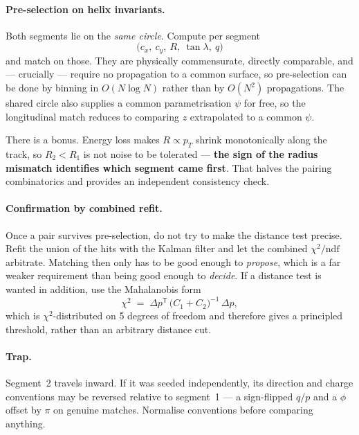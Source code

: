 \documentclass[11pt,a4paper]{article}
\begin{document}
\paragraph{Pre-selection on helix invariants.} Both segments lie on the
\emph{same circle}. Compute per segment
\begin{equation}
  \bigl(c_x,\ c_y,\ R,\ \tan\lambda,\ q\bigr)
\end{equation}
and match on those. They are physically commensurate, directly comparable, and
--- crucially --- require no propagation to a common surface, so pre-selection
can be done by binning in $O(N \log N)$ rather than by $O(N^2)$ propagations.
The shared circle also supplies a common parametrisation $\psi$ for free, so the
longitudinal match reduces to comparing $z$ extrapolated to a common $\psi$.

There is a bonus. Energy loss makes $R \propto p_T$ shrink monotonically along
the track, so $R_2 < R_1$ is not noise to be tolerated --- \textbf{the sign of
the radius mismatch identifies which segment came first}. That halves the
pairing combinatorics and provides an independent consistency check.

\paragraph{Confirmation by combined refit.} Once a pair survives pre-selection,
do not try to make the distance test precise. Refit the union of the hits with
the Kalman filter and let the combined $\chi^2/\mathrm{ndf}$ arbitrate. Matching
then only has to be good enough to \emph{propose}, which is a far weaker
requirement than being good enough to \emph{decide}. If a distance test is
wanted in addition, use the Mahalanobis form
\begin{equation}
  \chi^2 \;=\; \Delta p^{\mathsf T}\,\bigl(C_1 + C_2\bigr)^{-1}\,\Delta p ,
\end{equation}
which is $\chi^2$-distributed on 5 degrees of freedom and therefore gives a
principled threshold, rather than an arbitrary distance cut.

\paragraph{Trap.} Segment~2 travels inward. If it was seeded independently, its
direction and charge conventions may be reversed relative to segment~1 --- a
sign-flipped $q/p$ and a $\phi$ offset by $\pi$ on genuine matches. Normalise
conventions before comparing anything.
\end{document}

